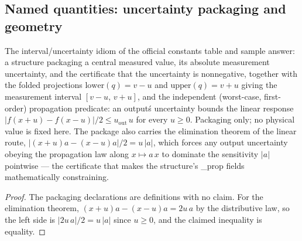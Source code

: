 \subsection*{Named quantities: uncertainty packaging and geometry}

\begin{definition}
\label{def:IPhO2026Problems_problem_IPhO_2026_4_A_1:MeasuredQuantity}
The interval/uncertainty idiom of the official constants table and
sample answer: a structure packaging a central measured value, its
absolute measurement uncertainty, and the certificate that the
uncertainty is nonnegative, together with the folded projections
$\mathrm{lower}(q) = v - u$ and $\mathrm{upper}(q) = v + u$ giving the
measurement interval $[v - u,\, v + u]$, and the independent
(worst-case, first-order) propagation predicate: an output\'s
uncertainty bounds the linear response
$|f(x+u) - f(x-u)|/2 \le u_{\mathrm{out}}\,u$ for every $u \ge 0$.
Packaging only; no physical value is fixed here.  The package also
carries the elimination theorem of the linear route,
$|(x+u)a - (x-u)a|/2 = u\,|a|$, which forces any output uncertainty
obeying the propagation law along $x \mapsto a\,x$ to dominate the
sensitivity $|a|$ pointwise --- the certificate that makes the
structure's \*\_prop fields mathematically constraining.
\end{definition}
\begin{proof}
The packaging declarations are definitions with no claim.  For the
elimination theorem, $(x+u)a - (x-u)a = 2u\,a$ by the distributive
law, so the left side is $|2u\,a|/2 = u\,|a|$ since $u \ge 0$, and
the claimed inequality is equality.
\end{proof}

